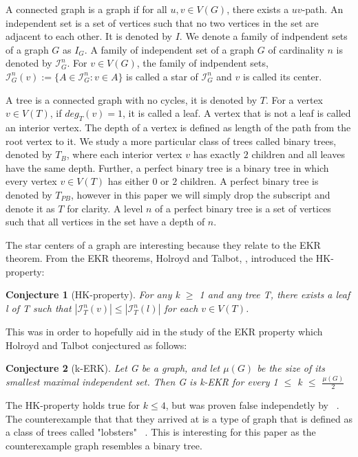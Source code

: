 \documentclass{amsart}
\newtheorem{conj}{Conjecture}[section]
\theoremstyle{definition}
\begin{document}
A connected graph is a graph if for all $u,v \in V(G)$, there exists a $uv$-path. An independent set is a set of vertices such that no two vertices in the set are adjacent to each other. It is denoted by $I$. We denote a family of indpendent sets of a graph $G$ as $I_G$. A family of independent set of a graph $G$ of cardinality $n$ is denoted by $\mathcal{I}^n_G$. For $v \in V(G)$, the family of indpendent sets, $\mathcal{I}^n_G(v) := \{A \in \mathcal{I}^n_G : v \in A\}$ is called a star of $\mathcal{I}^n_G$ and $v$ is called its center.

A tree is a connected graph with no cycles, it is denoted by $T$. For a vertex $v \in V(T)$, if $deg_T(v) = 1$, it is called a leaf. A vertex that is not a leaf is called an interior vertex. The depth of a vertex is defined as length of the path from the root vertex to it. We study a more particular class of trees called binary trees, denoted by $T_B$, where each interior vertex $v$ has exactly $2$ children and all leaves have the same depth. Further, a perfect binary tree is a binary tree in which every vertex $v \in V(T)$ has either $0$ or $2$ children. A perfect binary tree is denoted by $T_{PB}$, however in this paper we will simply drop the subscript and denote it as $T$ for clarity. A level $n$ of a perfect binary tree is a set of vertices such that all vertices in the set have a depth of $n$.

The star centers of a graph are interesting because they relate to the EKR theorem. From the EKR theorems, Holroyd and Talbot, \cite{MR2763040}, introduced the HK-property:

\begin{conj}[HK-property]
  For any k $\geq$ 1 and any tree T, there exists a leaf l of T such that $\left|\mathcal{I}^n_T(v)\right| \leq \left|\mathcal{I}^n_T(l)\right|$ for each $v \in V(T)$.
\end{conj}

This was in order to hopefully aid in the study of the EKR property which Holroyd and Talbot \cite{MR2136060} conjectured as follows:

\begin{conj}[k-ERK]
  Let G be a graph, and let $\mu(G)$ be the size of its smallest maximal independent set. Then G is k-EKR for every 1 $\leq$ k $\leq$ $\frac{\mu(G)}{2}$
\end{conj}

The HK-property holds true for $k \leq 4$, but was proven false independetly by ~\cite{MR3271819, MR3612439, MR2523796}. The counterexample that that they arrived at is a type of graph that is defined as a class of trees called "lobsters" ~\cite{MR4245360}. This is interesting for this paper as the counterexample graph resembles a binary tree.
\end{document}
